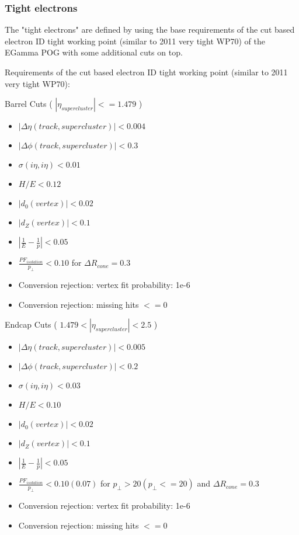 \subsubsection{Tight electrons}

The "tight electrons" are defined by using the base requirements of the cut based electron ID tight working point (similar to 2011 very tight WP70) of the EGamma POG with some additional cuts on top.
 
Requirements of the cut based electron ID tight working point (similar to 2011 very tight WP70):

Barrel Cuts ( $ |\eta_{supercluster}|<=1.479 $ )
\begin{itemize}
  \item $ | \Delta\eta(track,supercluster) | < 0.004 $
  \item $ | \Delta\phi(track,supercluster) | < 0.3  $
  \item $ \sigma(i\eta,i\eta) < 0.01 $
  \item $ H/E < 0.12 $
  \item $ |d_{0}(vertex)| < 0.02 $
  \item $ |d_{Z}(vertex)| < 0.1 $
  \item $ |\frac{1}{E}-\frac{1}{p}| < 0.05 $
  \item $ \frac{PF_{isolation}}{p_{\perp}} < 0.10 $ for $ \Delta R_{cone}=0.3 $
  \item Conversion rejection: vertex fit probability: 1e-6
  \item Conversion rejection: missing hits $<= 0$
\end{itemize}

Endcap Cuts ( $ 1.479 < |\eta_{supercluster}| < 2.5 $ )
\begin{itemize}
  \item $ | \Delta\eta(track,supercluster) | < 0.005 $
  \item $ | \Delta\phi(track,supercluster) | < 0.2  $
  \item $ \sigma(i\eta,i\eta) < 0.03 $
  \item $ H/E < 0.10 $
  \item $ |d_{0}(vertex)| < 0.02 $
  \item $ |d_{Z}(vertex)| < 0.1 $
  \item $ |\frac{1}{E}-\frac{1}{p}| < 0.05 $
  \item $ \frac{PF_{isolation}}{p_{\perp}} < 0.10(0.07) $ for $ p_{\perp} > 20 (p_{\perp} <= 20) $ and $ \Delta R_{cone}=0.3 $
  \item Conversion rejection: vertex fit probability: 1e-6
  \item Conversion rejection: missing hits $<= 0$
\end{itemize}

